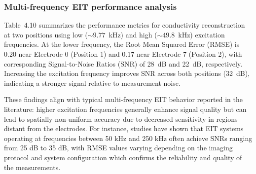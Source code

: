 \subsubsection{Multi-frequency EIT performance analysis}

Table~4.10 summarizes the performance metrics for conductivity reconstruction at two positions using low ($\sim 9.77$~kHz) and high ($\sim 49.8$~kHz) excitation frequencies. 
At the lower frequency, the Root Mean Squared Error (RMSE) is 0.20 near Electrode 0 (Position 1) and 0.17 near Electrode 7 (Position 2), with corresponding Signal-to-Noise Ratios (SNR) of 28~dB and 22~dB, respectively. 
Increasing the excitation frequency improves SNR across both positions (32~dB), indicating a stronger signal relative to measurement noise. 

These findings align with typical multi-frequency EIT behavior reported in the literature: higher excitation frequencies generally enhance signal quality but can lead to spatially non-uniform accuracy due to decreased sensitivity in regions distant from the electrodes. For instance, studies have shown that EIT systems operating at frequencies between 50 kHz and 250 kHz often achieve SNRs ranging from 25 dB to 35 dB, with RMSE values varying depending on the imaging protocol and system configuration which confirms the reliability and quality of the measurements.
